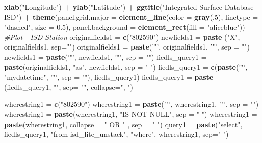 \documentclass[12pt,twoside]{reedthesis}
\newenvironment{Shaded}{\begin{snugshade}}{\end{snugshade}}
\newcommand{\CommentTok}[1]{\textcolor[rgb]{0.56,0.35,0.01}{\textit{#1}}}
\newcommand{\DataTypeTok}[1]{\textcolor[rgb]{0.13,0.29,0.53}{#1}}
\newcommand{\DecValTok}[1]{\textcolor[rgb]{0.00,0.00,0.81}{#1}}
\newcommand{\FloatTok}[1]{\textcolor[rgb]{0.00,0.00,0.81}{#1}}
\newcommand{\KeywordTok}[1]{\textcolor[rgb]{0.13,0.29,0.53}{\textbf{#1}}}
\newcommand{\NormalTok}[1]{#1}
\newcommand{\OperatorTok}[1]{\textcolor[rgb]{0.81,0.36,0.00}{\textbf{#1}}}
\newcommand{\StringTok}[1]{\textcolor[rgb]{0.31,0.60,0.02}{#1}}
\begin{document}
\begin{Shaded}
\begin{Highlighting}[]
\StringTok{  }\KeywordTok{xlab}\NormalTok{(}\StringTok{"Longitude"}\NormalTok{) }\OperatorTok{+}\StringTok{ }
\StringTok{  }\KeywordTok{ylab}\NormalTok{(}\StringTok{"Latitude"}\NormalTok{) }\OperatorTok{+}\StringTok{ }
\StringTok{  }\KeywordTok{ggtitle}\NormalTok{(}\StringTok{"Integrated Surface Database - ISD"}\NormalTok{) }\OperatorTok{+}\StringTok{ }
\StringTok{  }\KeywordTok{theme}\NormalTok{(}\DataTypeTok{panel.grid.major =} \KeywordTok{element_line}\NormalTok{(}\DataTypeTok{color =} \KeywordTok{gray}\NormalTok{(.}\DecValTok{5}\NormalTok{), }\DataTypeTok{linetype =} \StringTok{"dashed"}\NormalTok{, }\DataTypeTok{size =} \FloatTok{0.5}\NormalTok{), }\DataTypeTok{panel.background =} \KeywordTok{element_rect}\NormalTok{(}\DataTypeTok{fill =} \StringTok{"aliceblue"}\NormalTok{))}
\CommentTok{#Plot - ISD Station}
\NormalTok{originalfields1 =}\StringTok{ }\KeywordTok{c}\NormalTok{(}\StringTok{"802590"}\NormalTok{)}
\NormalTok{newfields1 =}\StringTok{ }\KeywordTok{paste}\NormalTok{ (}\StringTok{"X"}\NormalTok{, originalfields1, }\DataTypeTok{sep=}\StringTok{""}\NormalTok{)}
\NormalTok{originalfields1 =}\StringTok{ }\KeywordTok{paste}\NormalTok{(}\StringTok{'"'}\NormalTok{, originalfields1, }\StringTok{'"'}\NormalTok{, }\DataTypeTok{sep =} \StringTok{""}\NormalTok{)}
\NormalTok{newfields1 =}\StringTok{ }\KeywordTok{paste}\NormalTok{(}\StringTok{'"'}\NormalTok{, newfields1, }\StringTok{'"'}\NormalTok{, }\DataTypeTok{sep =} \StringTok{""}\NormalTok{)}
\NormalTok{fiedls_query1 =}\StringTok{ }\KeywordTok{paste}\NormalTok{(originalfields1, }\StringTok{"as"}\NormalTok{, newfields1, }\DataTypeTok{sep =} \StringTok{" "}\NormalTok{)}
\NormalTok{fiedls_query1 =}\StringTok{ }\KeywordTok{c}\NormalTok{(}\KeywordTok{paste}\NormalTok{(}\StringTok{'"'}\NormalTok{, }\StringTok{"mydatetime"}\NormalTok{, }\StringTok{'"'}\NormalTok{, }\DataTypeTok{sep =} \StringTok{""}\NormalTok{), fiedls_query1)}
\NormalTok{fiedls_query1 =}\StringTok{ }\KeywordTok{paste}\NormalTok{ (fiedls_query1, }\StringTok{""}\NormalTok{, }\DataTypeTok{sep=} \StringTok{""}\NormalTok{, }\DataTypeTok{collapse=}\StringTok{", "}\NormalTok{)}

\NormalTok{wherestring1 =}\StringTok{ }\KeywordTok{c}\NormalTok{(}\StringTok{"802590"}\NormalTok{)}
\NormalTok{wherestring1 =}\StringTok{ }\KeywordTok{paste}\NormalTok{(}\StringTok{'"'}\NormalTok{, wherestring1, }\StringTok{'"'}\NormalTok{, }\DataTypeTok{sep =} \StringTok{""}\NormalTok{)}
\NormalTok{wherestring1 =}\StringTok{ }\KeywordTok{paste}\NormalTok{(wherestring1, }\StringTok{"IS NOT NULL"}\NormalTok{, }\DataTypeTok{sep =} \StringTok{" "}\NormalTok{)}
\NormalTok{wherestring1 =}\StringTok{ }\KeywordTok{paste}\NormalTok{(wherestring1, }\DataTypeTok{collapse =} \StringTok{" OR "}\NormalTok{ , }\DataTypeTok{sep =} \StringTok{" "}\NormalTok{)}
\NormalTok{query1 =}\StringTok{ }\KeywordTok{paste}\NormalTok{(}\StringTok{"select"}\NormalTok{, fiedls_query1, }\StringTok{"from isd_lite_unstack"}\NormalTok{, }\StringTok{"where"}\NormalTok{, wherestring1, }\DataTypeTok{sep=}\StringTok{" "}\NormalTok{)}


\end{Highlighting}
\end{Shaded}
\end{document}
